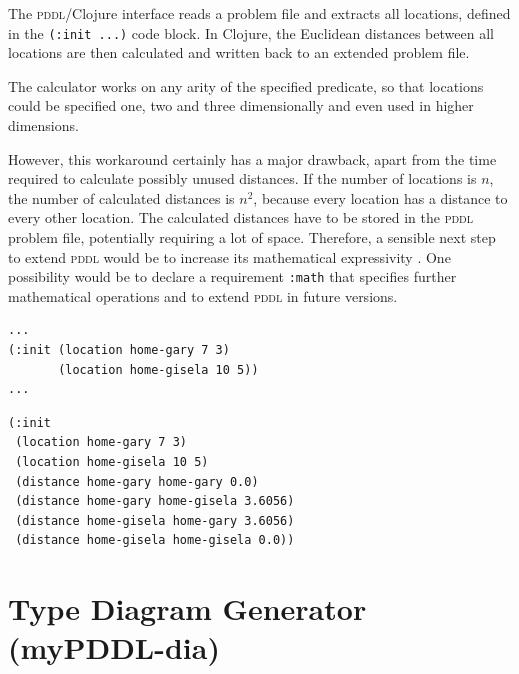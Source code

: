 \documentclass[a4paper,12pt]{report}
\newcommand{\mypddl}{\smallerft[0.8]{myPDDL}\xspace}
\newcommand{\pddl}{\textsc{pddl}\xspace}
\newcommand\smallerft[2][0.85]{{\scalefont{#1}#2}}
\begin{document}
The \pddl/Clojure interface reads a problem file and extracts all
locations, defined in the \texttt{(:init ...)} code block. In Clojure, the
Euclidean distances between all locations are then calculated and
written back to an extended problem file.

The calculator works on any arity of the specified predicate, so that
locations could be specified one, two and three dimensionally and even
used in higher dimensions.

However, this workaround certainly has a major drawback, apart from
the time required to calculate possibly unused distances. If the
number of locations is \(n\), the number of calculated distances is
\(n^2\), because every location has a distance to every other location.
The calculated distances have to be stored in the \pddl problem file,
potentially requiring a lot of space. Therefore, a sensible next step
to extend \pddl would be to increase its mathematical expressivity
\cite{parkinson2012increasing}. One possibility would be to declare a
requirement \texttt{:math} that specifies further mathematical operations and
to extend \pddl in future versions.

\begin{listing}[H]
\begin{verbatim}
...
(:init (location home-gary 7 3)
       (location home-gisela 10 5)) 
...
\end{verbatim}
\caption{Extract of the extended file \emph{Gary's Huge Problem} before using \mypddl-loc.}
\end{listing}

\begin{listing}[H]
\begin{verbatim}
(:init
 (location home-gary 7 3)
 (location home-gisela 10 5)
 (distance home-gary home-gary 0.0)
 (distance home-gary home-gisela 3.6056)
 (distance home-gisela home-gary 3.6056)
 (distance home-gisela home-gisela 0.0))
\end{verbatim}
\caption{After the application of \mypddl-loc, the calculated distances are inserted in the \texttt{(:init ...)} code block of a copy of the problem file.}
\end{listing}
\section{Type Diagram Generator (myPDDL-dia)}
\label{sec-4-6}
\label{subsec:gen}
\end{document}
